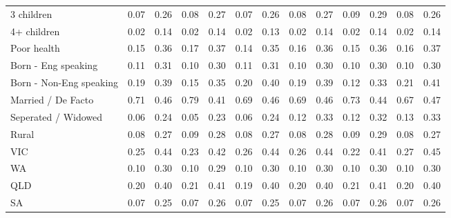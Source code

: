 {\begin{tabular}{l*{6}{cc}}
3 children          &        0.07&        0.26&        0.08&        0.27&        0.07&        0.26&        0.08&        0.27&        0.09&        0.29&        0.08&        0.26\\
4+ children         &        0.02&        0.14&        0.02&        0.14&        0.02&        0.13&        0.02&        0.14&        0.02&        0.14&        0.02&        0.14\\
Poor health         &        0.15&        0.36&        0.17&        0.37&        0.14&        0.35&        0.16&        0.36&        0.15&        0.36&        0.16&        0.37\\
Born - Eng speaking &        0.11&        0.31&        0.10&        0.30&        0.11&        0.31&        0.10&        0.30&        0.10&        0.30&        0.10&        0.30\\
Born - Non-Eng speaking&        0.19&        0.39&        0.15&        0.35&        0.20&        0.40&        0.19&        0.39&        0.12&        0.33&        0.21&        0.41\\
Married / De Facto  &        0.71&        0.46&        0.79&        0.41&        0.69&        0.46&        0.69&        0.46&        0.73&        0.44&        0.67&        0.47\\
Seperated / Widowed &        0.06&        0.24&        0.05&        0.23&        0.06&        0.24&        0.12&        0.33&        0.12&        0.32&        0.13&        0.33\\
Rural               &        0.08&        0.27&        0.09&        0.28&        0.08&        0.27&        0.08&        0.28&        0.09&        0.29&        0.08&        0.27\\
VIC                 &        0.25&        0.44&        0.23&        0.42&        0.26&        0.44&        0.26&        0.44&        0.22&        0.41&        0.27&        0.45\\
WA                  &        0.10&        0.30&        0.10&        0.29&        0.10&        0.30&        0.10&        0.30&        0.10&        0.30&        0.10&        0.30\\
QLD                 &        0.20&        0.40&        0.21&        0.41&        0.19&        0.40&        0.20&        0.40&        0.21&        0.41&        0.20&        0.40\\
SA                  &        0.07&        0.25&        0.07&        0.26&        0.07&        0.25&        0.07&        0.26&        0.07&        0.26&        0.07&        0.26\\

\end{tabular}}
